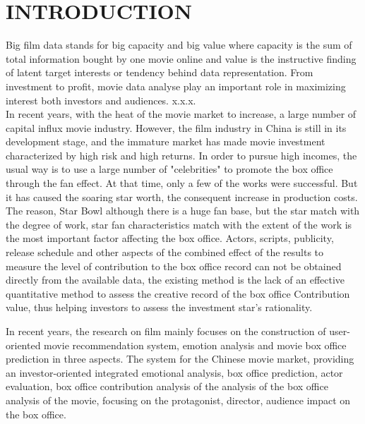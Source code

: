 \section{INTRODUCTION}
\par Big film data stands for big capacity and big value where capacity is the sum of total information bought by one movie online and value is the instructive finding of latent target interests or tendency behind data representation. From investment to profit, movie data analyse play an important role in maximizing interest both investors and audiences. x.x.x.\\
In recent years, with the heat of the movie market to increase, a large number of capital influx movie industry. However, the film industry in China is still in its development stage, and the immature market has made movie investment characterized by high risk and high returns. In order to pursue high incomes, the usual way is to use a large number of "celebrities" to promote the box office through the fan effect. At that time, only a few of the works were successful. But it has caused the soaring star worth, the consequent increase in production costs. The reason, Star Bowl although there is a huge fan base, but the star match with the degree of work, star fan characteristics match with the extent of the work is the most important factor affecting the box office. Actors, scripts, publicity, release schedule and other aspects of the combined effect of the results to measure the level of contribution to the box office record can not be obtained directly from the available data, the existing method is the lack of an effective quantitative method to assess the creative record of the box office Contribution value, thus helping investors to assess the investment star's rationality.
\par In recent years, the research on film mainly focuses on the construction of user-oriented movie recommendation system, emotion analysis and movie box office prediction in three aspects.
The system for the Chinese movie market, providing an investor-oriented integrated emotional analysis, box office prediction, actor evaluation, box office contribution analysis of the analysis of the box office analysis of the movie, focusing on the protagonist, director, audience impact on the box office.
